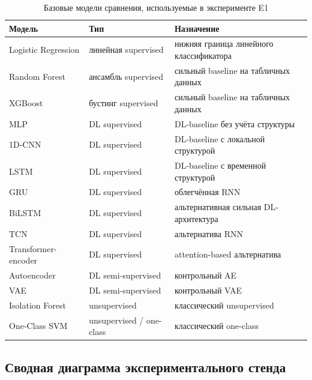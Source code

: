 \begin{table}[H]
\centering
\caption{Базовые модели сравнения, используемые в эксперименте E1}
\label{tab:baselines}
\renewcommand{\arraystretch}{1.25}
\begin{tabularx}{\linewidth}{@{}lXX@{}}
\toprule
\textbf{Модель} & \textbf{Тип} & \textbf{Назначение} \\
\midrule
Logistic Regression &
линейная supervised & нижняя граница линейного классификатора \\
Random Forest~\cite{breiman2001rf} &
ансамбль supervised & сильный baseline на табличных данных \\
XGBoost~\cite{chen2016xgboost} &
бустинг supervised & сильный baseline на табличных данных \\
MLP &
DL supervised & DL-baseline без учёта структуры \\
1D-CNN &
DL supervised & DL-baseline с локальной структурой \\
LSTM~\cite{hochreiter1997lstm} &
DL supervised & DL-baseline с временной структурой \\
GRU~\cite{cho2014gru} &
DL supervised & облегчённая RNN \\
BiLSTM &
DL supervised & альтернативная сильная DL-архитектура \\
TCN~\cite{bai2018tcn} &
DL supervised & альтернатива RNN \\
Transformer-encoder~\cite{vaswani2017attention} &
DL supervised & attention-based альтернатива \\
Autoencoder~\cite{mirsky2018kitsune} &
DL semi-supervised & контрольный AE \\
VAE~\cite{kingma2014vae, lopez2017cvae} &
DL semi-supervised & контрольный VAE \\
Isolation Forest~\cite{liu2008isolation} &
unsupervised & классический unsupervised \\
One-Class SVM~\cite{scholkopf2001ocsvm} &
unsupervised / one-class & классический one-class \\
\bottomrule
\end{tabularx}
\end{table}

\subsection{Сводная диаграмма экспериментального стенда}

